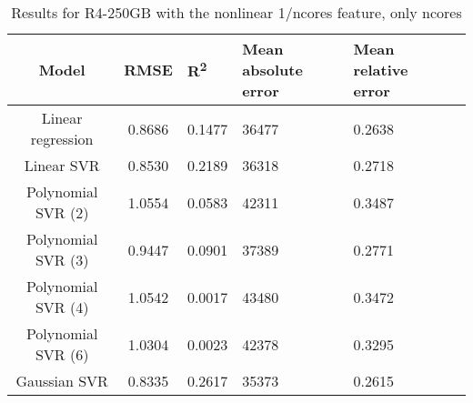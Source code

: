 \begin{table}[H]
\centering
\begin{adjustbox}{center}
\begin{tabular}{c | c M{1.2cm} M{2.5cm} M{2.5cm} M{1.8cm}}
Model & RMSE & R\textsuperscript{2} & Mean absolute error & Mean relative error \tabularnewline
\hline
Linear regression & 0.8686 & 0.1477 &  36477 & 0.2638 \\
Linear SVR & 0.8530 & 0.2189 &  36318 & 0.2718 \\
Polynomial SVR (2) & 1.0554 & 0.0583 &  42311 & 0.3487 \\
Polynomial SVR (3) & 0.9447 & 0.0901 &  37389 & 0.2771 \\
Polynomial SVR (4) & 1.0542 & 0.0017 &  43480 & 0.3472 \\
Polynomial SVR (6) & 1.0304 & 0.0023 &  42378 & 0.3295 \\
Gaussian SVR & 0.8335 & 0.2617 &  35373 & 0.2615 \\
\end{tabular}
\end{adjustbox}
\\
\caption{Results for R4-250GB with the nonlinear 1/ncores feature, only ncores}
\label{tab:all_nonlinear_R4_250}
\end{table}

